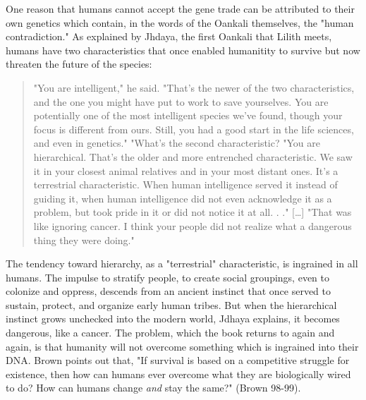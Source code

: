 \documentclass[11pt]{article}
\begin{document}
\begin{enumerate}
One reason that humans cannot accept the gene trade can be attributed
to their own genetics which contain, in the words of the Oankali
themselves, the "human contradiction." As explained by Jhdaya, the
first Oankali that Lilith meets, humans have two characteristics that
once enabled humanitity to survive but now threaten the future of the
species:
\begin{quote}
"You are intelligent," he said. "That's the newer of the two
characteristics, and the one you might have put to work to save
yourselves. You are potentially one of the most intelligent species
we've found, though your focus is different from ours. Still, you had
a good start in the life sciences, and even in genetics."
"What's the second characteristic?  
"You are hierarchical. That's the older and more entrenched
characteristic. We saw it in your closest animal relatives and in your
most distant ones. It's a terrestrial characteristic. When human
intelligence served it instead of guiding it, when human intelligence
did not even acknowledge it as a problem, but took pride in it or did
not notice it at all. . ." [\ldots{}] "That was like ignoring cancer. I
think your people did not realize what a dangerous thing they were
doing."
\end{quote}
The tendency toward hierarchy, as a "terrestrial" characteristic, is
ingrained in all humans. The impulse to stratify people, to create
social groupings, even to colonize and oppress, descends from an
ancient instinct that once served to sustain, protect, and organize
early human tribes. But when the hierarchical instinct grows unchecked
into the modern world, Jdhaya explains, it becomes dangerous, like a
cancer. The problem, which the book returns to again and again, is
that humanity will not overcome something which is ingrained into
their DNA. Brown points out that, "If survival is based on a
competitive struggle for existence, then how can humans ever overcome
what they are biologically wired to do?  How can humans change \emph{and}
stay the same?"  (Brown 98-99).


\end{enumerate}
\end{document}
